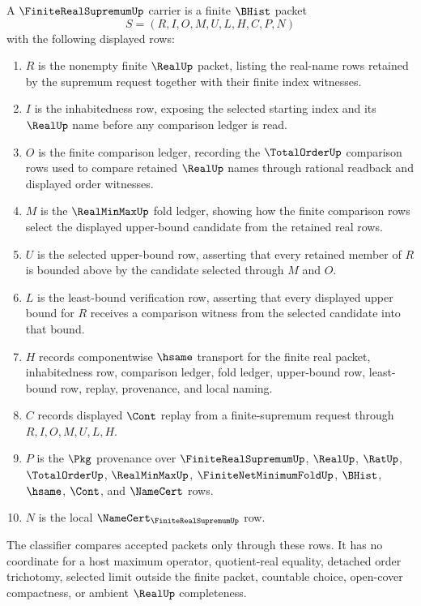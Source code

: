\begin{definition}
\label{def:finite-real-supremum-carrier}
A $\FiniteRealSupremumUp$ carrier is a finite $\BHist$ packet
$$
S=(R,I,O,M,U,L,H,C,P,N)
$$
with the following displayed rows:
\begin{enumerate}
\item $R$ is the nonempty finite $\RealUp$ packet, listing the real-name rows retained by the supremum request together with their finite index witnesses.
\item $I$ is the inhabitedness row, exposing the selected starting index and its $\RealUp$ name before any comparison ledger is read.
\item $O$ is the finite comparison ledger, recording the $\TotalOrderUp$ comparison rows used to compare retained $\RealUp$ names through rational readback and displayed order witnesses.
\item $M$ is the $\RealMinMaxUp$ fold ledger, showing how the finite comparison rows select the displayed upper-bound candidate from the retained real rows.
\item $U$ is the selected upper-bound row, asserting that every retained member of $R$ is bounded above by the candidate selected through $M$ and $O$.
\item $L$ is the least-bound verification row, asserting that every displayed upper bound for $R$ receives a comparison witness from the selected candidate into that bound.
\item $H$ records componentwise $\hsame$ transport for the finite real packet, inhabitedness row, comparison ledger, fold ledger, upper-bound row, least-bound row, replay, provenance, and local naming.
\item $C$ records displayed $\Cont$ replay from a finite-supremum request through $R,I,O,M,U,L,H$.
\item $P$ is the $\Pkg$ provenance over $\FiniteRealSupremumUp$, $\RealUp$, $\RatUp$, $\TotalOrderUp$, $\RealMinMaxUp$, $\FiniteNetMinimumFoldUp$, $\BHist$, $\hsame$, $\Cont$, and $\NameCert$ rows.
\item $N$ is the local $\NameCert_{\FiniteRealSupremumUp}$ row.
\end{enumerate}
The classifier compares accepted packets only through these rows. It has no coordinate for a host maximum operator, quotient-real equality, detached order trichotomy, selected limit outside the finite packet, countable choice, open-cover compactness, or ambient $\RealUp$ completeness.
\end{definition}

